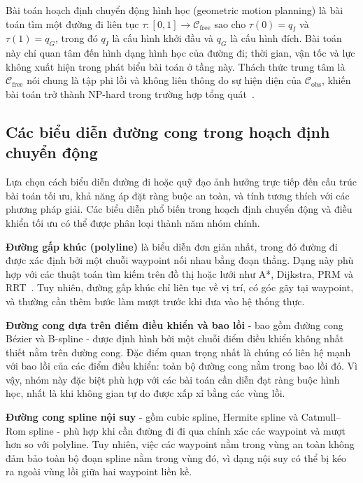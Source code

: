 Bài toán hoạch định chuyển động hình học (geometric motion planning) là bài toán
tìm một đường đi liên tục $\tau \colon [0,1] \to \mathcal{C}_{\mathrm{free}}$ sao
cho $\tau(0) = q_I$ và $\tau(1) = q_G$, trong đó $q_I$ là cấu hình khởi đầu và
$q_G$ là cấu hình đích.
Bài toán này chỉ quan tâm đến hình dạng hình học của đường đi; thời gian, vận tốc
và lực không xuất hiện trong phát biểu bài toán ở tầng này.
Thách thức trung tâm là $\mathcal{C}_{\mathrm{free}}$ nói chung là tập phi lồi và
không liên thông do sự hiện diện của $\mathcal{C}_{\mathrm{obs}}$, khiến bài toán
trở thành NP-hard trong trường hợp tổng quát~\cite{LaValle2006}.

\subsection{Các biểu diễn đường cong trong hoạch định chuyển động}
\label{subsec:curve_representations}

Lựa chọn cách biểu diễn đường đi hoặc quỹ đạo ảnh hưởng trực tiếp đến cấu trúc
bài toán tối ưu, khả năng áp đặt ràng buộc an toàn, và tính tương thích với các
phương pháp giải.
Các biểu diễn phổ biến trong hoạch định chuyển động và điều khiển tối ưu có thể
được phân loại thành năm nhóm chính.

\textbf{Đường gấp khúc (polyline)} là biểu diễn đơn giản nhất, trong đó đường đi
được xác định bởi một chuỗi waypoint nối nhau bằng đoạn thẳng.
Dạng này phù hợp với các thuật toán tìm kiếm trên đồ thị hoặc lưới như A*,
Dijkstra, PRM và RRT~\cite{LaValle2006}.
Tuy nhiên, đường gấp khúc chỉ liên tục về vị trí, có góc gãy tại waypoint, và
thường cần thêm bước làm mượt trước khi đưa vào hệ thống thực.

\textbf{Đường cong dựa trên điểm điều khiển và bao lồi} - bao gồm đường cong
Bézier và B-spline - được định hình bởi một chuỗi điểm điều khiển không nhất
thiết nằm trên đường cong.
Đặc điểm quan trọng nhất là chúng có liên hệ mạnh với bao lồi của các điểm điều
khiển: toàn bộ đường cong nằm trong bao lồi đó.
Vì vậy, nhóm này đặc biệt phù hợp với các bài toán cần diễn đạt ràng buộc hình
học, nhất là khi không gian tự do được xấp xỉ bằng các vùng lồi.

\textbf{Đường cong spline nội suy} - gồm cubic spline, Hermite spline và
Catmull--Rom spline - phù hợp khi cần đường đi đi qua chính xác các waypoint
và mượt hơn so với polyline.
Tuy nhiên, việc các waypoint nằm trong vùng an toàn không đảm bảo toàn bộ đoạn
spline nằm trong vùng đó, vì dạng nội suy có thể bị kéo ra ngoài vùng lồi giữa
hai waypoint liền kề.

